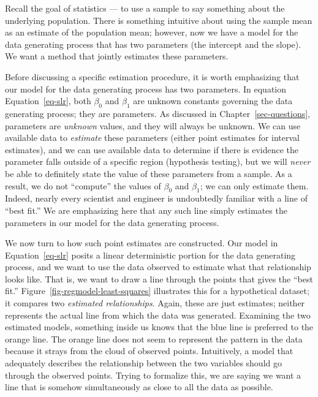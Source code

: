 \documentclass[
  letterpaper,
  DIV=11,
  numbers=noendperiod]{scrreprt}
\theoremstyle{plain}
\theoremstyle{definition}
\theoremstyle{definition}
\theoremstyle{remark}
\begin{document}
Recall the goal of statistics --- to use a sample to say something about
the underlying population. There is something intuitive about using the
sample mean as an estimate of the population mean; however, now we have
a model for the data generating process that has two parameters (the
intercept and the slope). We want a method that jointly estimates these
parameters.

Before discussing a specific estimation procedure, it is worth
emphasizing that our model for the data generating process has two
parameters. In equation Equation~\ref{eq-slr}, both \(\beta_0\) and
\(\beta_1\) are unknown constants governing the data generating process;
they are parameters. As discussed in Chapter~\ref{sec-questions},
parameters are \emph{unknown} values, and they will always be unknown.
We can use available data to \emph{estimate} these parameters (either
point estimates for interval estimates), and we can use available data
to determine if there is evidence the parameter falls outside of a
specific region (hypothesis testing), but we will \emph{never} be able
to definitely state the value of these parameters from a sample. As a
result, we do not ``compute'' the values of \(\beta_0\) and \(\beta_1\);
we can only estimate them. Indeed, nearly every scientist and engineer
is undoubtedly familiar with a line of ``best fit.'' We are emphasizing
here that any such line simply estimates the parameters in our model for
the data generating process.

We now turn to how such point estimates are constructed. Our model in
Equation~\ref{eq-slr} posits a linear deterministic portion for the data
generating process, and we want to use the data observed to estimate
what that relationship looks like. That is, we want to draw a line
through the points that gives the ``best fit.''
Figure~\ref{fig-regmodel-least-squares} illustrates this for a
hypothetical dataset; it compares two \emph{estimated relationships}.
Again, these are just estimates; neither represents the actual line from
which the data was generated. Examining the two estimated models,
something inside us knows that the blue line is preferred to the orange
line. The orange line does not seem to represent the pattern in the data
because it strays from the cloud of observed points. Intuitively, a
model that adequately describes the relationship between the two
variables should go through the observed points. Trying to formalize
this, we are saying we want a line that is somehow simultaneously as
close to all the data as possible.
\end{document}
